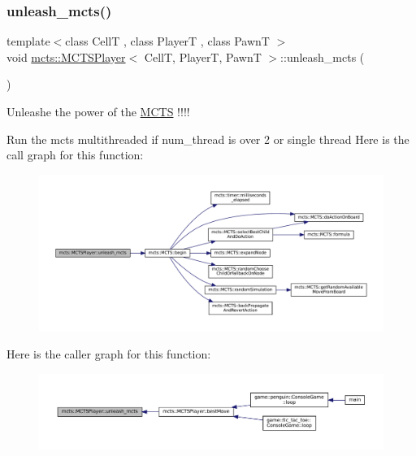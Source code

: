 \subsubsection{\texorpdfstring{unleash\+\_\+mcts()}{unleash\_mcts()}}
{\footnotesize\ttfamily template$<$class CellT , class PlayerT , class PawnT $>$ \\
void \hyperlink{classmcts_1_1_m_c_t_s_player}{mcts\+::\+M\+C\+T\+S\+Player}$<$ CellT, PlayerT, PawnT $>$\+::unleash\+\_\+mcts (\begin{DoxyParamCaption}{ }\end{DoxyParamCaption})\hspace{0.3cm}{\ttfamily [protected]}}



Unleashe the power of the \hyperlink{classmcts_1_1_m_c_t_s}{M\+C\+TS} !!!! 

Run the mcts multithreaded if num\+\_\+thread is over 2 or single thread Here is the call graph for this function\+:
\nopagebreak
\begin{figure}[H]
\begin{center}
\leavevmode
\includegraphics[width=350pt]{classmcts_1_1_m_c_t_s_player_a53677f7c7f9cfe4b7999af8abcfb8641_cgraph}
\end{center}
\end{figure}
Here is the caller graph for this function\+:
\nopagebreak
\begin{figure}[H]
\begin{center}
\leavevmode
\includegraphics[width=350pt]{classmcts_1_1_m_c_t_s_player_a53677f7c7f9cfe4b7999af8abcfb8641_icgraph}
\end{center}
\end{figure}
\mbox{\label{classmcts_1_1_m_c_t_s_player_a02d0a6f2219decabb51ff9d8c4c9b355}} 

